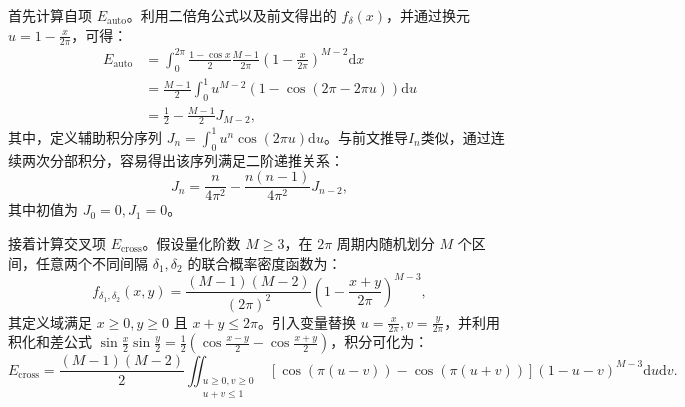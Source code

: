 首先计算自项 $E_{\text{auto}}$。利用二倍角公式以及前文得出的 $f_\delta(x)$，并通过换元 $u = 1 - \frac{x}{2\pi}$，可得：
\begin{align}
	E_{\text{auto}} &= \int_0^{2\pi} \frac{1-\cos x}{2} \frac{M-1}{2\pi}\left(1-\frac{x}{2\pi}\right)^{M-2} \mathrm{d}x \nonumber \\
	&= \frac{M-1}{2} \int_0^1 u^{M-2} \left( 1 - \cos(2\pi - 2\pi u) \right) \mathrm{d}u \nonumber \\
	&= \frac{1}{2} - \frac{M-1}{2} J_{M-2}, \label{eq:ddma_E_auto}
\end{align}
其中，定义辅助积分序列 $J_n = \int_0^1 u^n \cos(2\pi u) \mathrm{d}u$。与前文推导$I_n$类似，通过连续两次分部积分，容易得出该序列满足二阶递推关系：
\begin{equation}
	J_n = \frac{n}{4\pi^2} - \frac{n(n-1)}{4\pi^2} J_{n-2},
\end{equation}
其中初值为 $J_0 = 0, J_1 = 0$。

接着计算交叉项 $E_{\text{cross}}$。假设量化阶数 $M \ge 3$，在 $2\pi$ 周期内随机划分 $M$ 个区间，任意两个不同间隔 $\delta_1, \delta_2$ 的联合概率密度函数为：
\begin{equation}
	f_{\delta_1, \delta_2}(x, y) = \frac{(M-1)(M-2)}{(2\pi)^2} \left(1 - \frac{x+y}{2\pi}\right)^{M-3},
\end{equation}
其定义域满足 $x \ge 0, y \ge 0$ 且 $x+y \le 2\pi$。引入变量替换 $u = \frac{x}{2\pi}, v = \frac{y}{2\pi}$，并利用积化和差公式 $\sin\frac{x}{2}\sin\frac{y}{2} = \frac{1}{2}(\cos\frac{x-y}{2} - \cos\frac{x+y}{2})$，积分可化为：
\begin{equation}
	E_{\text{cross}} = \frac{(M-1)(M-2)}{2} \iint_{\substack{u \ge 0, v \ge 0 \\ u+v \le 1}} \left[ \cos(\pi(u-v)) - \cos(\pi(u+v)) \right] (1-u-v)^{M-3} \mathrm{d}u \mathrm{d}v.
\end{equation}

